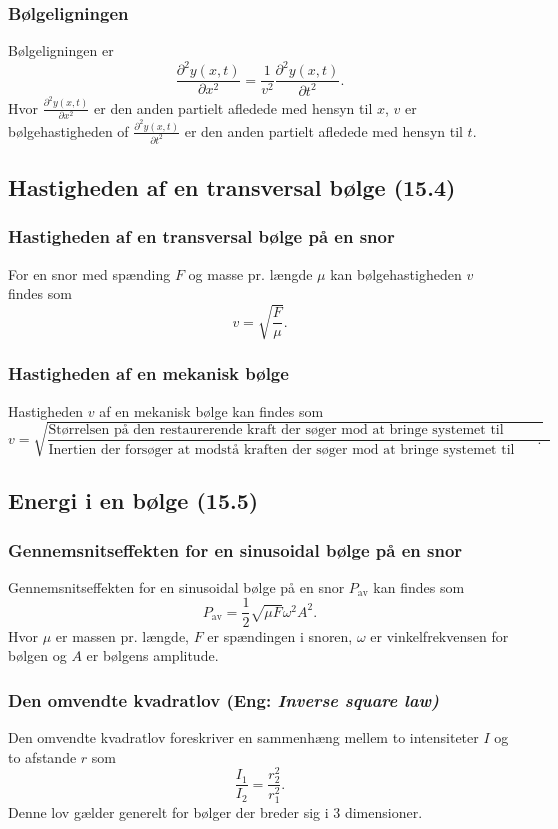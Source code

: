 \subsubsection{Bølgeligningen}
Bølgeligningen er
\[ 
\frac{\partial^2 y(x,t)}{\partial x^2} = \frac{1}{v^2} \frac{\partial^2 y(x,t)}{\partial t^2}
.\]
Hvor $\frac{\partial^2 y(x,t)}{\partial x^2}$ er den anden partielt afledede med hensyn til $x$, $v$ er bølgehastigheden of $\frac{\partial^2 y(x,t)}{\partial t^2}$ er den anden partielt afledede med hensyn til $t$.


\subsection{Hastigheden af en transversal bølge (15.4)}

\subsubsection{Hastigheden af en transversal bølge på en snor} \label{afs:hastra}
For en snor med spænding $F$ og masse pr. længde $\mu$ kan bølgehastigheden $v$ findes som
\[ 
v = \sqrt{\frac{F}{\mu}}
.\]


\subsubsection{Hastigheden af en mekanisk bølge}
Hastigheden $v$ af en mekanisk bølge kan findes som
\[ 
v = \sqrt{\frac{\text{Størrelsen på den restaurerende kraft der søger mod at bringe systemet til ligevægt}}{\text{Inertien der forsøger at modstå kraften der søger mod at bringe systemet til ligevægt}}}
.\]


\subsection{Energi i en bølge (15.5)}

\subsubsection{Gennemsnitseffekten for en sinusoidal bølge på en snor} \label{afs:gnseffbølsno}
Gennemsnitseffekten for en sinusoidal bølge på en snor $P_{\text{av}}$ kan findes som
\[ 
P_{\text{av}} = \frac{1}{2}\sqrt{\mu F} \omega^2 A^2
.\]
Hvor $\mu$ er massen pr. længde, $F$ er spændingen i snoren, $\omega$ er vinkelfrekvensen for bølgen og $A$ er bølgens amplitude.


\subsubsection{Den omvendte kvadratlov (Eng: \textit{Inverse square law)}} \label{afs:omvkvalov}
Den omvendte kvadratlov foreskriver en sammenhæng mellem to intensiteter $I$ og to afstande $r$ som
\[ 
\frac{I_1}{I_2} = \frac{r_2^2}{r_1^2}
.\]
Denne lov gælder generelt for bølger der breder sig i 3 dimensioner.



